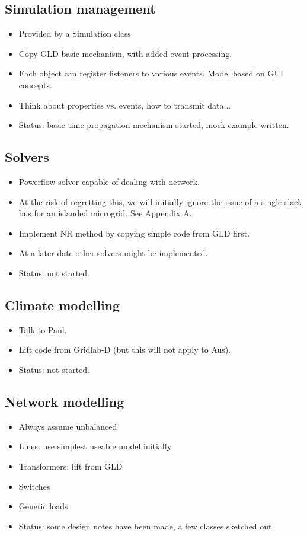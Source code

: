 \documentclass[12pt]{article}
\newcommand{\itm}[1]{\begin{itemize}#1\end{itemize}}
\begin{document}
\subsection{Simulation management}
\itm{
	\item Provided by a Simulation class
	\item Copy GLD basic mechanism, with added event processing.
	\item Each object can register listeners to various events. Model based on GUI concepts.
	\item Think about properties vs. events, how to transmit data...
	\item Status: basic time propagation mechanism started, mock example written.
}

\subsection{Solvers}
\itm{
	\item Powerflow solver capable of dealing with network.
	\item At the risk of regretting this, we will initially ignore the issue of a single slack bus for an islanded microgrid. See Appendix A.
	\item Implement NR method by copying simple code from GLD first.
	\item At a later date other solvers might be implemented.
	\item Status: not started.
}

\subsection{Climate modelling}
\itm{
	\item Talk to Paul.
	\item Lift code from Gridlab-D (but this will not apply to Aus).
	\item Status: not started.
}

\subsection{Network modelling}
\itm{
	\item Always assume unbalanced
	\item Lines: use simplest useable model initially
	\item Transformers: lift from GLD
	\item Switches
	\item Generic loads
	\item Status: some design notes have been made, a few classes sketched out.
}
\end{document}
